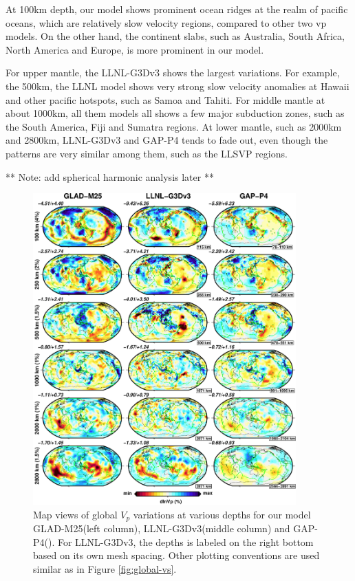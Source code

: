 \documentclass[extra,mreferee]{gji}
\begin{document}
At 100km depth, our model shows prominent ocean ridges at the realm of pacific
oceans, which are relatively slow velocity regions, compared to other two vp models.
On the other hand, the continent slabs, such as Australia, South Africa,
North America and Europe, is more prominent in our model.

For upper mantle, the LLNL-G3Dv3 shows the largest variations. For example,
the 500km, the LLNL model shows very strong slow velocity anomalies at
Hawaii and other pacific hotspots, such as Samoa and Tahiti.
For middle mantle at about 1000km, all them models all shows a few major
subduction zones, such as the South America, Fiji and Sumatra regions.
At lower mantle, such as 2000km and 2800km, LLNL-G3Dv3 and GAP-P4 tends to
fade out, even though the patterns are very similar among them, such as
the LLSVP regions.

** Note: add spherical harmonic analysis later **

\begin{figure}
\includegraphics[width=0.9\textwidth]{figures/depth_slice/globe_vp_LLNL-GAP.pdf}
  \caption{Map views of global $V_p$ variations at various depths for our model
  GLAD-M25(left column), LLNL-G3Dv3(middle column) \citep{simmons2012llnl} and
  GAP-P4(\citep{fukao2013subducted}).
  For LLNL-G3Dv3, the depths is labeled on the right
  bottom based on its own mesh spacing. Other plotting conventions are used
  similar as in Figure \ref{fig:global-vs}.}
\label{fig:global-vp}
\centering
\end{figure}
\end{document}
